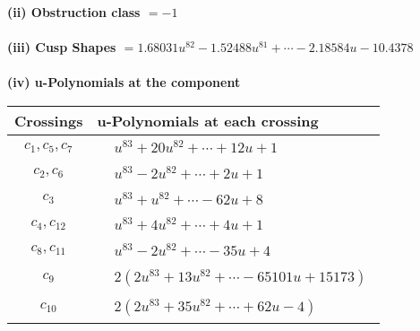 \documentclass[1p]{elsarticle_modified}
\theoremstyle{definition}
\begin{document}
\flushleft \textbf{(ii) Obstruction class $= -1$}\\~\\
\flushleft \textbf{(iii) Cusp Shapes $= 1.68031 u^{82}-1.52488 u^{81}+\cdots-2.18584 u-10.4378$}\\~\\
\newpage\renewcommand{\arraystretch}{1}
\flushleft \textbf{(iv) u-Polynomials at the component}\newline \\
\begin{tabular}{m{50pt}|m{274pt}}
Crossings & \hspace{64pt}u-Polynomials at each crossing \\
\hline $$\begin{aligned}c_{1},c_{5},c_{7}\end{aligned}$$&$\begin{aligned}
&u^{83}+20 u^{82}+\cdots+12 u+1
\end{aligned}$\\
\hline $$\begin{aligned}c_{2},c_{6}\end{aligned}$$&$\begin{aligned}
&u^{83}-2 u^{82}+\cdots+2 u+1
\end{aligned}$\\
\hline $$\begin{aligned}c_{3}\end{aligned}$$&$\begin{aligned}
&u^{83}+u^{82}+\cdots-62 u+8
\end{aligned}$\\
\hline $$\begin{aligned}c_{4},c_{12}\end{aligned}$$&$\begin{aligned}
&u^{83}+4 u^{82}+\cdots+4 u+1
\end{aligned}$\\
\hline $$\begin{aligned}c_{8},c_{11}\end{aligned}$$&$\begin{aligned}
&u^{83}-2 u^{82}+\cdots-35 u+4
\end{aligned}$\\
\hline $$\begin{aligned}c_{9}\end{aligned}$$&$\begin{aligned}
&2(2 u^{83}+13 u^{82}+\cdots-65101 u+15173)
\end{aligned}$\\
\hline $$\begin{aligned}c_{10}\end{aligned}$$&$\begin{aligned}
&2(2 u^{83}+35 u^{82}+\cdots+62 u-4)
\end{aligned}$\\
\hline
\end{tabular}\\~\\
\end{document}
